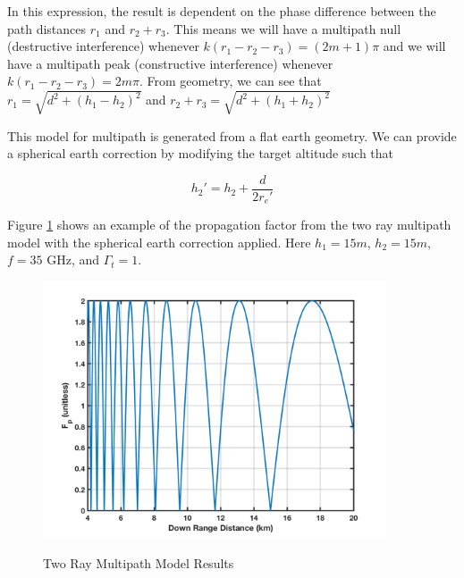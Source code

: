 In this expression, the result is dependent on the phase difference between the path distances $r_1$ and $r_2 + r_3$. This means we will have a multipath null (destructive interference) whenever $k\left(r_1 - r_2 - r_3\right) = (2m + 1)\pi$ and we will have a multipath peak (constructive interference) whenever $k\left(r_1 - r_2 - r_3\right) = 2m\pi$. From geometry, we can see that $r_1 = \sqrt{d^2 + (h_1-h_2)^2}$ and $r_2 + r_3 = \sqrt{d^2 + (h_1+h_2)^2}$

This model for multipath is generated from a flat earth geometry. We can provide a spherical earth correction by modifying the target altitude \cite{blake_radar} such that

\begin{equation}
  \label{env_eq:3r}
h_2' = h_2 + \frac{d}{2r_e'}
\end{equation}
\renewcommand{\baselinestretch}{2} \small\normalsize

Figure \ref{env_fig:3t} shows an example of the propagation factor from the two ray multipath model with the spherical earth correction applied. Here $h_1 = 15m$, $h_2 = 15m$, $f = 35$ GHz, and $\Gamma_t = 1$. 

\begin{figure}[H]
  \begin{center}
\includegraphics[width=4in]{../media/multistatic/two_ray_multipath_results.png}
  \end{center}
  \renewcommand{\baselinestretch}{1} \small\normalsize
  \begin{quote}
    \caption[Two Ray Multipath Model Results]{Two Ray Multipath Model Results\label{env_fig:3t}}
  \end{quote}
\end{figure}
\renewcommand{\baselinestretch}{2} \small\normalsize

